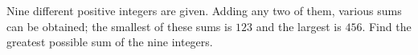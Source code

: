Nine different positive integers are given. Adding any two of them, various sums can be obtained; the smallest of these sums is $123$ and the largest is $456$. Find the greatest possible sum of the nine integers.

